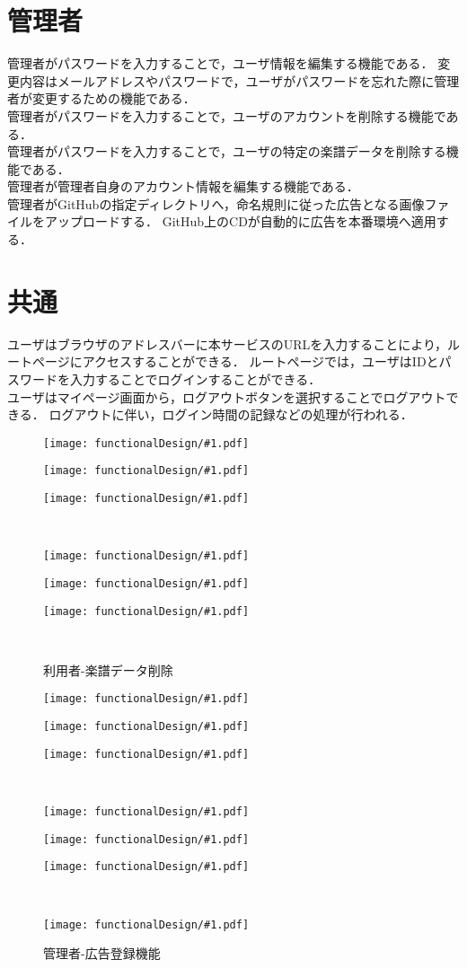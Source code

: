 \section{管理者}
管理者がパスワードを入力することで，ユーザ情報を編集する機能である．
変更内容はメールアドレスやパスワードで，ユーザがパスワードを忘れた際に管理者が変更するための機能である．\\
管理者がパスワードを入力することで，ユーザのアカウントを削除する機能である．\\
管理者がパスワードを入力することで，ユーザの特定の楽譜データを削除する機能である．\\
管理者が管理者自身のアカウント情報を編集する機能である．\\
管理者がGitHubの指定ディレクトリへ，命名規則に従った広告となる画像ファイルをアップロードする．
GitHub上のCDが自動的に広告を本番環境へ適用する．
\section{共通}
ユーザはブラウザのアドレスバーに本サービスのURLを入力することにより，ルートページにアクセスすることができる．
ルートページでは，ユーザはIDとパスワードを入力することでログインすることができる．\\
ユーザはマイページ画面から，ログアウトボタンを選択することでログアウトできる．
ログアウトに伴い，ログイン時間の記録などの処理が行われる．
\newcommand{\icd}[2]{\begin{minipage}[b]{.32\textwidth}\centering\texttt{[image: functionalDesign/\#1.pdf]}\caption{#2}\label{#2}\end{minipage}}
\begin{figure}[p]
    \centering
    \icd{211-機能設計-利用者側-ユーザ登録}{利用者-ユーザ登録}
    \icd{212-機能設計-利用者側-ユーザ編集}{利用者-ユーザ編集}
    \icd{213-機能設計-利用者側-ユーザ削除}{利用者-ユーザ削除}\\
    \icd{214-機能設計-利用者側-楽譜データ登録}{利用者-楽譜データ登録}
    \icd{215-機能設計-利用者側-楽譜データ編集}{利用者-楽譜データ編集}
    \icd{216-機能設計-利用者側-楽譜データ削除}{利用者-楽譜データ削除}\\
\end{figure}
\begin{figure}[p]
    \centering
    \icd{221-機能設計-管理者側-ユーザ編集}{管理者-ユーザ編集}
    \icd{222-機能設計-管理者側-ユーザ削除}{管理者-ユーザ削除}
    \icd{223-機能設計-管理者側-楽譜データ削除}{管理者-楽譜データ削除}\\
    \icd{224-機能設計-管理者側-管理者情報編集機能}{管理者-管理者情報編集}
    \icd{217-機能設計-利用者側-ログイン}{共通-ログイン}
    \icd{218-機能設計-利用者側-ログアウト}{共通-ログアウト}\\
    \icd{225-機能設計-管理者側-広告登録機能}{管理者-広告登録機能}
\end{figure}